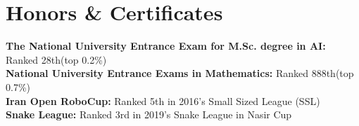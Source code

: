 
\section{Honors \& Certificates}
  \vspace{2pt}
  \resumeSubHeadingListStart
    \small{\item{
        \textbf{The National University Entrance Exam for M.Sc. degree in AI:} { Ranked 28th(top 0.2\%)}
        \\ \vspace{3pt}
        \textbf{National University Entrance Exams in Mathematics:} { Ranked 888th(top 0.7\%)}
        \\ \vspace{3pt}
        \textbf{Iran Open RoboCup:} { Ranked 5th in 2016's Small Sized League (SSL)}
        \\ \vspace{3pt}
        \textbf{Snake League:} { Ranked 3rd in 2019's Snake League in Nasir Cup}
    }}
  \resumeSubHeadingListEnd